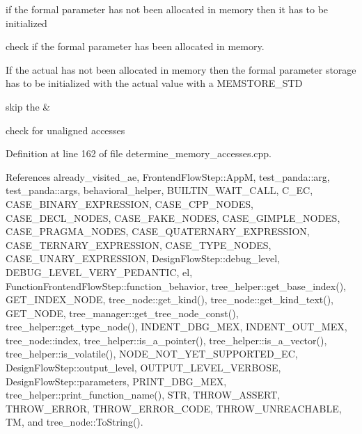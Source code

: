 if the formal parameter has not been allocated in memory then it has to be initialized

check if the formal parameter has been allocated in memory.

If the actual has not been allocated in memory then the formal parameter storage has to be initialized with the actual value with a M\+E\+M\+S\+T\+O\+R\+E\+\_\+\+S\+TD

skip the \&

check for unaligned accesses 

Definition at line 162 of file determine\+\_\+memory\+\_\+accesses.\+cpp.



References already\+\_\+visited\+\_\+ae, Frontend\+Flow\+Step\+::\+AppM, test\+\_\+panda\+::arg, test\+\_\+panda\+::args, behavioral\+\_\+helper, B\+U\+I\+L\+T\+I\+N\+\_\+\+W\+A\+I\+T\+\_\+\+C\+A\+LL, C\+\_\+\+EC, C\+A\+S\+E\+\_\+\+B\+I\+N\+A\+R\+Y\+\_\+\+E\+X\+P\+R\+E\+S\+S\+I\+ON, C\+A\+S\+E\+\_\+\+C\+P\+P\+\_\+\+N\+O\+D\+ES, C\+A\+S\+E\+\_\+\+D\+E\+C\+L\+\_\+\+N\+O\+D\+ES, C\+A\+S\+E\+\_\+\+F\+A\+K\+E\+\_\+\+N\+O\+D\+ES, C\+A\+S\+E\+\_\+\+G\+I\+M\+P\+L\+E\+\_\+\+N\+O\+D\+ES, C\+A\+S\+E\+\_\+\+P\+R\+A\+G\+M\+A\+\_\+\+N\+O\+D\+ES, C\+A\+S\+E\+\_\+\+Q\+U\+A\+T\+E\+R\+N\+A\+R\+Y\+\_\+\+E\+X\+P\+R\+E\+S\+S\+I\+ON, C\+A\+S\+E\+\_\+\+T\+E\+R\+N\+A\+R\+Y\+\_\+\+E\+X\+P\+R\+E\+S\+S\+I\+ON, C\+A\+S\+E\+\_\+\+T\+Y\+P\+E\+\_\+\+N\+O\+D\+ES, C\+A\+S\+E\+\_\+\+U\+N\+A\+R\+Y\+\_\+\+E\+X\+P\+R\+E\+S\+S\+I\+ON, Design\+Flow\+Step\+::debug\+\_\+level, D\+E\+B\+U\+G\+\_\+\+L\+E\+V\+E\+L\+\_\+\+V\+E\+R\+Y\+\_\+\+P\+E\+D\+A\+N\+T\+IC, el, Function\+Frontend\+Flow\+Step\+::function\+\_\+behavior, tree\+\_\+helper\+::get\+\_\+base\+\_\+index(), G\+E\+T\+\_\+\+I\+N\+D\+E\+X\+\_\+\+N\+O\+DE, tree\+\_\+node\+::get\+\_\+kind(), tree\+\_\+node\+::get\+\_\+kind\+\_\+text(), G\+E\+T\+\_\+\+N\+O\+DE, tree\+\_\+manager\+::get\+\_\+tree\+\_\+node\+\_\+const(), tree\+\_\+helper\+::get\+\_\+type\+\_\+node(), I\+N\+D\+E\+N\+T\+\_\+\+D\+B\+G\+\_\+\+M\+EX, I\+N\+D\+E\+N\+T\+\_\+\+O\+U\+T\+\_\+\+M\+EX, tree\+\_\+node\+::index, tree\+\_\+helper\+::is\+\_\+a\+\_\+pointer(), tree\+\_\+helper\+::is\+\_\+a\+\_\+vector(), tree\+\_\+helper\+::is\+\_\+volatile(), N\+O\+D\+E\+\_\+\+N\+O\+T\+\_\+\+Y\+E\+T\+\_\+\+S\+U\+P\+P\+O\+R\+T\+E\+D\+\_\+\+EC, Design\+Flow\+Step\+::output\+\_\+level, O\+U\+T\+P\+U\+T\+\_\+\+L\+E\+V\+E\+L\+\_\+\+V\+E\+R\+B\+O\+SE, Design\+Flow\+Step\+::parameters, P\+R\+I\+N\+T\+\_\+\+D\+B\+G\+\_\+\+M\+EX, tree\+\_\+helper\+::print\+\_\+function\+\_\+name(), S\+TR, T\+H\+R\+O\+W\+\_\+\+A\+S\+S\+E\+RT, T\+H\+R\+O\+W\+\_\+\+E\+R\+R\+OR, T\+H\+R\+O\+W\+\_\+\+E\+R\+R\+O\+R\+\_\+\+C\+O\+DE, T\+H\+R\+O\+W\+\_\+\+U\+N\+R\+E\+A\+C\+H\+A\+B\+LE, TM, and tree\+\_\+node\+::\+To\+String().



